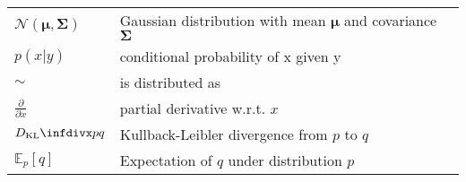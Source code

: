 \begin{tabular}[h]{@{} p{} p{} @{}}
$\mathcal{N}(\mathbf{\mu}, \mathbf{\Sigma})$ & Gaussian distribution with mean $\mathbf{\mu}$ and covariance $\mathbf{\Sigma}$ \\
$p(x \vert y)$ & conditional probability of x given y \\
$\sim$ & is distributed as \\
$\frac{\partial}{\partial x}$ & partial derivative w.r.t. $x$ \\
$\dkl{p}{q}$ & Kullback-Leibler divergence from $p$ to $q$ \\
$\mathbb{E}_{p}[q]$ & Expectation of $q$ under distribution $p$
\end{tabular}
